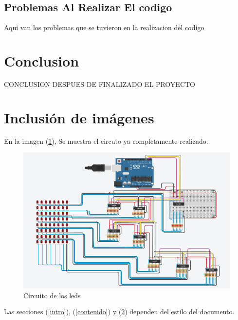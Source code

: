 \documentclass{article}
\begin{document}
\subsection{Problemas Al Realizar El codigo}
Aqui van los problemas que se tuvieron en la realizacion del codigo
\section{Conclusion} \label{Conclusion}
CONCLUSION DESPUES DE FINALIZADO EL PROYECTO
\section{Inclusión de imágenes} \label{images}
En la imagen (\ref{fig:circuito.PNG}), Se muestra el circuto ya completamente realizado.

\begin{figure}[h]
\includegraphics[scale=0.8]{circuito.PNG}
\graphicspath{ {images/} }
\centering
\caption{Circuito de los leds}
\label{fig:circuito.PNG}
\end{figure}

Las secciones (\ref{intro}), (\ref{contenido}) y (\ref{images}) dependen del estilo del documento.


\end{document}

